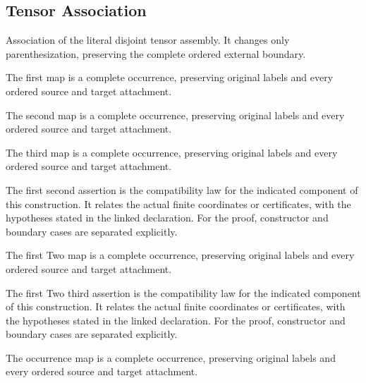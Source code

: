 \subsection{Tensor Association}
Association of the literal disjoint tensor assembly. It changes only parenthesization, preserving the complete ordered external boundary.

The first map is a complete occurrence, preserving original labels and every ordered source and target attachment.
\par{}

The second map is a complete occurrence, preserving original labels and every ordered source and target attachment.
\par{}

The third map is a complete occurrence, preserving original labels and every ordered source and target attachment.
\par{}

The first second assertion is the compatibility law for the indicated component of this construction. It relates the actual finite coordinates or certificates, with the hypotheses stated in the linked declaration.
For the proof, constructor and boundary cases are separated explicitly.
\par{}

The first Two map is a complete occurrence, preserving original labels and every ordered source and target attachment.
\par{}

The first Two third assertion is the compatibility law for the indicated component of this construction. It relates the actual finite coordinates or certificates, with the hypotheses stated in the linked declaration.
For the proof, constructor and boundary cases are separated explicitly.
\par{}

The occurrence map is a complete occurrence, preserving original labels and every ordered source and target attachment.
\par{}

